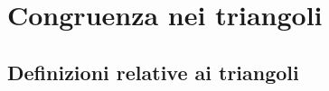 
\chapter{Congruenza nei triangoli}
\label{chap:congruenza_nei_triangoli}


\section{Definizioni relative ai triangoli}
\label{sect:definizioni_triangoli}

